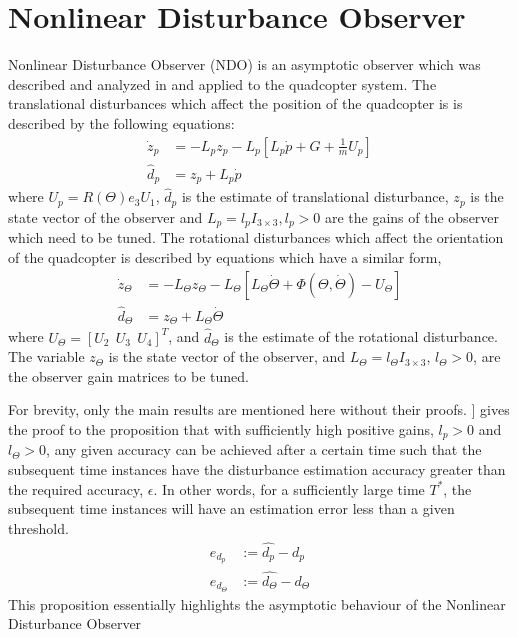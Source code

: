 \documentclass[letterpaper%
, twoside%
, 12pt%
,memoire%
, english%
,creativecommons,hyperref%
]{thETS}
\begin{document}
\section{Nonlinear Disturbance Observer} \label{Sec:NDO}
Nonlinear Disturbance Observer (NDO) is an asymptotic observer which was described and analyzed in \citep{bash2019analysis} and applied to the quadcopter system. The translational disturbances which affect the position of the quadcopter is is described by the following equations: 
\begin{equation}
\begin{split}
\label{eqn:NDO1}
\dot{z}_p &= -L_pz_p - L_p[L_p\dot{p}+G+\frac{1}{m}U_p ]\\
\hat{d}_p&=z_p + L_p\dot{p}
\end{split}
\end{equation}
where $U_p=R(\Theta) e_3 U_1$, $\widehat{d}_p$ is the estimate of translational disturbance,  $z_p$ is the state vector of the observer and $L_p=l_p I_{3 \times 3}, l_p >0$ are the gains of the observer which need to be tuned. 
The rotational disturbances which affect the orientation of the quadcopter is described by equations which have a similar form, 
\begin{equation}
\begin{split}
\label{eqn:NDO2}
\dot{z}_\Theta &= -L_\Theta z_\Theta - L_\Theta[L_\Theta\dot{\Theta}+\Phi(\Theta,\dot{\Theta}) - U_\Theta] \\
\hat{d}_\Theta&=z_\Theta + L_\Theta\dot{\Theta}
\end{split}
\end{equation}
where $U_\Theta=[U_2\ \ U_3\ \ U_4]^T$, and $\widehat{d}_\Theta$ is the estimate of the rotational disturbance. The variable $z_\Theta$ is the state vector of the observer, and $L_\Theta=l_\Theta I_{3 \times 3}$,  $l_\Theta >0$, are the observer gain matrices to be tuned.

For brevity, only the main results are mentioned here without their proofs. \citep{RN114}] gives the proof to the proposition that with sufficiently high positive gains, $l_p>0$ and $l_\Theta>0$, any given accuracy can be achieved after a certain time such that the subsequent time instances have the disturbance estimation accuracy greater than the required accuracy, $\epsilon$. In other words, for a sufficiently large time $T^*$, the subsequent time instances will have an estimation error less than a given threshold.
\begin{align} \label{eqn:NDO3}
e_{d_p} &:=\hat{d_p} - d_p \\
e_{d_\Theta} &:=\hat{d_\Theta}-d_\Theta
\end{align}
This proposition essentially highlights the asymptotic behaviour of the Nonlinear Disturbance Observer
\end{document}
